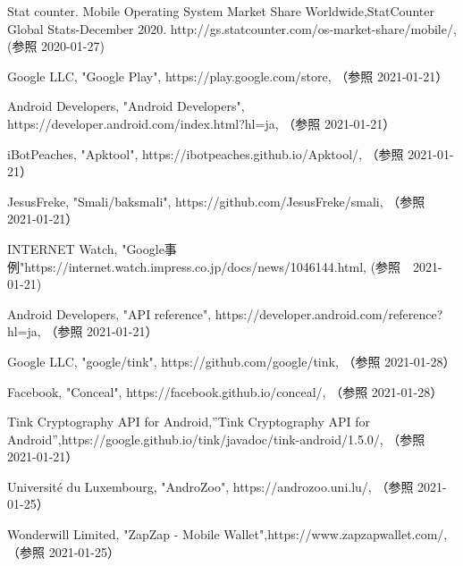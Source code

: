 \newpage
\begin{thebibliography}{99}

Stat counter. Mobile Operating System Market Share Worldwide,StatCounter Global Stats-December 2020. http://gs.statcounter.com/os-market-share/mobile/,(参照 2020-01-27)

Google LLC, "Google Play", https://play.google.com/store, （参照 2021-01-21）

Android Developers, "Android Developers", https://developer.android.com/index.html?hl=ja, （参照 2021-01-21）

iBotPeaches, "Apktool", https://ibotpeaches.github.io/Apktool/, （参照 2021-01-21）

JesusFreke, "Smali/baksmali", https://github.com/JesusFreke/smali, （参照 2021-01-21）


INTERNET Watch, "Google事例"https://internet.watch.impress.co.jp/docs/news/1046144.html, (参照　2021-01-21)

Android Developers, "API reference", https://developer.android.com/reference?hl=ja, （参照 2021-01-21）

Google LLC, "google/tink", https://github.com/google/tink, （参照 2021-01-28）

Facebook, "Conceal", https://facebook.github.io/conceal/, （参照 2021-01-28）

Tink Cryptography API for Android,''Tink Cryptography API for Android'',https://google.github.io/tink/javadoc/tink-android/1.5.0/, （参照 2021-01-21）

Université du Luxembourg, "AndroZoo",  https://androzoo.uni.lu/, （参照 2021-01-25）

Wonderwill Limited, "ZapZap - Mobile Wallet",https://www.zapzapwallet.com/,（参照 2021-01-25）


\end{thebibliography}